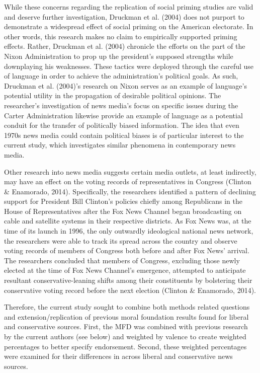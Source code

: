 \documentclass[english,,man]{apa6}
\begin{document}
While these concerns regarding the replication of social priming studies are valid and deserve further investigation, Druckman et al. (2004) does not purport to demonstrate a widespread effect of social priming on the American electorate. In other words, this research makes no claim to empirically supported priming effects. Rather, Druckman et al. (2004) chronicle the efforts on the part of the Nixon Administration to prop up the president's supposed strengths while downplaying his weaknesses. These tactics were deployed through the careful use of language in order to achieve the administration's political goals. As such, Druckman et al. (2004)'s research on Nixon serves as an example of language's potential utility in the propagation of desirable political opinions. The researcher's investigation of news media's focus on specific issues during the Carter Administration likewise provide an example of language as a potential conduit for the transfer of politically biased information. The idea that even 1970s news media could contain political biases is of particular interest to the current study, which investigates similar phenomena in contemporary news media.

Other research into news media suggests certain media outlets, at least indirectly, may have an effect on the voting records of representatives in Congress (Clinton \& Enamorado, 2014). Specifically, the researchers identified a pattern of declining support for President Bill Clinton's policies chiefly among Republicans in the House of Representatives after the Fox News Channel began broadcasting on cable and satellite systems in their respective districts. As Fox News was, at the time of its launch in 1996, the only outwardly ideological national news network, the researchers were able to track its spread across the country and observe voting records of members of Congress both before and after Fox News' arrival. The researchers concluded that members of Congress, excluding those newly elected at the time of Fox News Channel's emergence, attempted to anticipate resultant conservative-leaning shifts among their constituents by bolstering their conservative voting record before the next election (Clinton \& Enamorado, 2014).

Therefore, the current study sought to combine both methods related questions and extension/replication of previous moral foundation results found for liberal and conservative sources. First, the MFD was combined with previous research by the current authors (see below) and weighted by valence to create weighted percentages to better specify endorsement. Second, these weighted percentages were examined for their differences in across liberal and conservative news sources.
\end{document}

